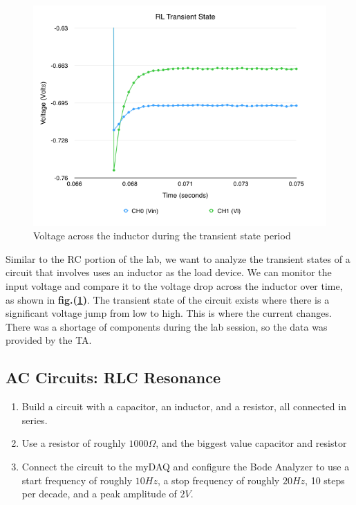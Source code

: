 \documentclass{article}
\begin{document}
\begin{figure}[H]
    \centering
    \includegraphics[width=\textwidth]{charts/rlcurve_transient}
    \caption{Voltage across the inductor during the transient state period}
    \label{rlcurve_transient}
\end{figure}

Similar to the RC portion of the lab, we want to analyze the transient states of
a circuit that involves uses an inductor as the load device. We can monitor the
input voltage and compare it to the voltage drop across the inductor over time,
as shown in \textbf{fig.(\ref{rlcurve_transient})}. The transient state of the
circuit exists where there is a significant voltage jump from low to high. This
is where the current changes. There was a shortage of components during the lab
session, so the data was provided by the TA.

\subsection{AC Circuits: RLC Resonance}

\begin{enumerate}
    \item Build a circuit with a capacitor, an inductor, and a resistor, all
    connected in series.
    \item Use a resistor of roughly $1000\Omega$, and the biggest value
    capacitor and resistor
    \item Connect the circuit to the myDAQ and configure the Bode Analyzer to
    use a start frequency of roughly $10Hz$, a stop frequency of roughly $20Hz$,
    10 steps per decade, and a peak amplitude of $2V$.
\end{enumerate}
\end{document}
